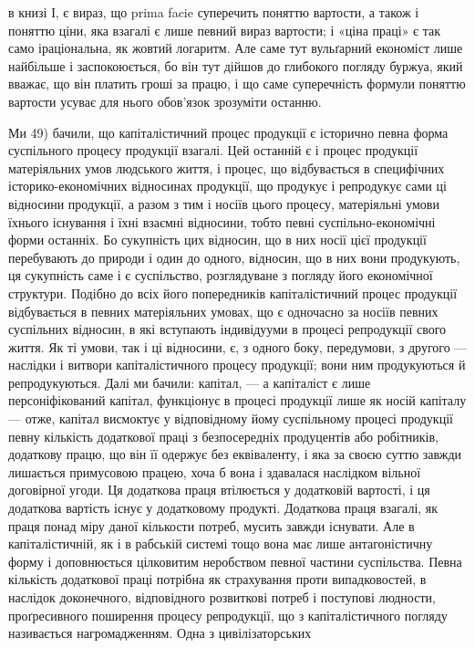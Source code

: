 в книзі І, є вираз, що prima facie суперечить поняттю вартости, а також
і поняттю ціни, яка взагалі є лише певний вираз вартости; і «ціна праці»
є так само іраціональна, як жовтий логаритм. Але саме тут вульґарний
економіст лише найбільше і заспокоюється, бо він тут дійшов до глибокого погляду
буржуа, який вважає, що він платить гроші за працю, і що саме суперечність
формули поняттю вартости усуває для нього обов’язок зрозуміти останню.

Ми 49) бачили, що капіталістичний процес продукції є історично певна
форма суспільного процесу продукції взагалі. Цей останній є і процес продукції
матеріяльних умов людського життя, і процес, що відбувається в специфічних
історико-економічних відносинах продукції, що продукує і репродукує сами
ці відносини продукції, а разом з тим і носіїв цього процесу, матеріяльні умови їхнього
існування і їхні взаємні відносини, тобто певні суспільно-економічні
форми останніх. Бо сукупність цих відносин, що в них носії цієї продукції перебувають
до природи і один до одного, відносин, що в них вони продукують, ця сукупність
саме і є суспільство, розглядуване з погляду його економічної структури.
Подібно до всіх його попередників капіталістичний процес продукції відбувається
в певних матеріяльних умовах, що є одночасно за носіїв певних суспільних
відносин, в які вступають індивідууми в процесі репродукції свого життя. Як
ті умови, так і ці відносини, є, з одного боку, передумови, з другого — наслідки
і витвори капіталістичного процесу продукції; вони ним продукуються й репродукуються.
Далі ми бачили: капітал, — а капіталіст є лише персоніфікований
капітал, функціонує в процесі продукції лише як носій капіталу — отже, капітал
висмоктує у відповідному йому суспільному процесі продукції певну кількість
додаткової праці з безпосередніх продуцентів або робітників, додаткову працю,
що він її одержує без еквіваленту, і яка за своєю суттю завжди лишається
примусовою працею, хоча б вона і здавалася наслідком вільної договірної угоди.
Ця додаткова праця втілюється у додатковій вартості, і ця додаткова вартість
існує у додатковому продукті. Додаткова праця взагалі, як праця понад міру
даної кількости потреб, мусить завжди існувати. Але в капіталістичній, як і в рабській
системі тощо вона має лише антагоністичну форму і доповнюється цілковитим
неробством певної частини суспільства. Певна кількість додаткової праці потрібна
як страхування проти випадковостей, в наслідок доконечного, відповідного розвиткові
потреб і поступові людности, проґресивного поширення процесу репродукції,
що з капіталістичного погляду називається нагромадженням. Одна з цивілізаторських

